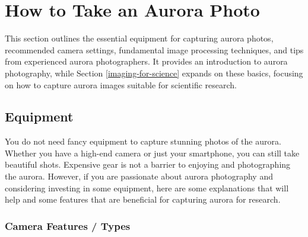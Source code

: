 \documentclass{article}
\newcommand{\contributed}[1]{%
    \par\noindent
    \begingroup
    \setlength{\leftskip}{1em}%
    \itshape
    Contributors: #1
    \par
    \endgroup
    \vspace{0.5em}
}
\begin{document}
\section{How to Take an Aurora Photo} 
This section outlines the essential equipment for capturing aurora photos, recommended camera settings, fundamental image processing techniques, and tips from experienced aurora photographers. It provides an introduction to aurora photography, while Section \ref{imaging-for-science} expands on these basics, focusing on how to capture aurora images suitable for scientific research.


\subsection{Equipment}

You do not need fancy equipment to capture stunning photos of the aurora. Whether you have a high-end camera or just your smartphone, you can still take beautiful shots. Expensive gear is not a barrier to enjoying and photographing the aurora. However, if you are passionate about aurora photography and considering investing in some equipment, here are some explanations that will help and some features that are beneficial for capturing aurora for research.

\subsubsection{Camera Features / Types}
\end{document}
